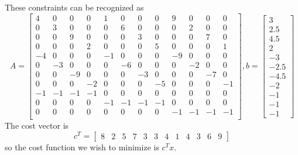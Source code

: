 \documentclass{article}
\begin{document}
\begin{itemize}
\begin{soln}
			These constraints can be recognized as	
			\[ A=\begin{bmatrix}
					4 & 0 & 0 & 0 & 1 & 0 & 0 & 0 & 9 & 0 & 0 & 0 \\
					0 & 3 & 0 & 0 & 0 & 6 & 0 & 0 & 0 & 2 & 0 & 0 \\
					0 & 0 & 9 & 0 & 0 & 0 & 3 & 0 & 0 & 0 & 7 & 0 \\
					0 & 0 & 0 & 2 & 0 & 0 & 0 & 5 & 0 & 0 & 0 & 1 \\
					-4 & 0 & 0 & 0 & -1 & 0 & 0 & 0 & -9 & 0 & 0 & 0 \\
					0 & -3 & 0 & 0 & 0 & -6 & 0 & 0 & 0 & -2 & 0 & 0 \\
					0 & 0 & -9 & 0 & 0 & 0 & -3 & 0 & 0 & 0 & -7 & 0 \\
					0 & 0 & 0 & -2 & 0 & 0 & 0 & -5 & 0 & 0 & 0 & -1 \\
					-1 & -1 & -1 & -1 & 0 & 0 & 0 & 0 & 0 & 0 & 0 & 0 \\
					0 & 0 & 0 & 0 & -1 & -1 & -1 & -1 & 0 & 0 & 0 & 0 \\
					0 & 0 & 0 & 0 & 0 & 0 & 0 & 0 & -1 & -1 & -1 & -1 \\
			\end{bmatrix}, b=\begin{bmatrix}
			3 \\ 2.5 \\ 4.5 \\ 2 \\ -3 \\ -2.5 \\ -4.5 \\ -2 \\ -1 \\ -1 \\ -1
			\end{bmatrix}\]
			The cost vector is \[c^T = \begin{bmatrix}
					8 & 2 & 5 & 7 & 3 & 3 & 4 & 1 & 4 & 3 & 6 & 9
			\end{bmatrix}\] so the cost function we wish to minimize is $c^Tx.$

		\end{soln}

\end{itemize}
\end{document}
